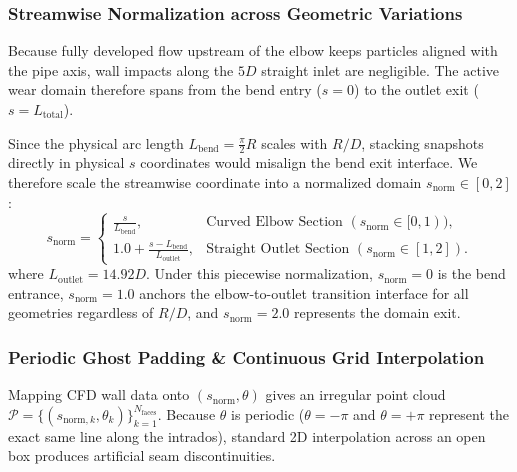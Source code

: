 \documentclass{article}
\begin{document}
\subsubsection{Streamwise Normalization across Geometric Variations}
Because fully developed flow upstream of the elbow keeps particles aligned with the pipe axis, wall impacts along the $5D$ straight inlet are negligible. The active wear domain therefore spans from the bend entry ($s=0$) to the outlet exit ($s = L_{\text{total}}$).

Since the physical arc length $L_{\text{bend}} = \frac{\pi}{2}R$ scales with $R/D$, stacking snapshots directly in physical $s$ coordinates would misalign the bend exit interface. We therefore scale the streamwise coordinate into a normalized domain $s_{\text{norm}} \in [0, 2]$:
\begin{equation}
    s_{\text{norm}} = \begin{cases}
    \displaystyle \frac{s}{L_{\text{bend}}}, & \text{Curved Elbow Section } (s_{\text{norm}} \in [0, 1)), \\[8pt]
    \displaystyle 1.0 + \frac{s - L_{\text{bend}}}{L_{\text{outlet}}}, & \text{Straight Outlet Section } (s_{\text{norm}} \in [1, 2]).
    \end{cases}
    \label{eq:snorm_piecewise}
\end{equation}
where $L_{\text{outlet}} = 14.92 D$. Under this piecewise normalization, $s_{\text{norm}} = 0$ is the bend entrance, $s_{\text{norm}} = 1.0$ anchors the elbow-to-outlet transition interface for all geometries regardless of $R/D$, and $s_{\text{norm}} = 2.0$ represents the domain exit.

\subsubsection{Periodic Ghost Padding \& Continuous Grid Interpolation}
Mapping CFD wall data onto $(s_{\text{norm}}, \theta)$ gives an irregular point cloud $\mathcal{P} = \{(s_{\text{norm}, k}, \theta_k)\}_{k=1}^{N_{\text{faces}}}$. Because $\theta$ is periodic ($\theta = -\pi$ and $\theta = +\pi$ represent the exact same line along the intrados), standard 2D interpolation across an open box produces artificial seam discontinuities.
\end{document}
